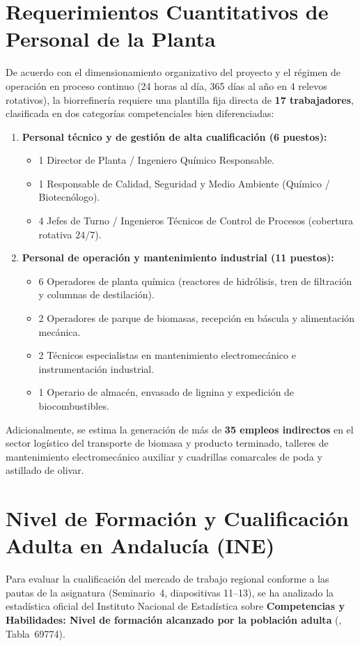 \documentclass{report}
\begin{document}
\section{Requerimientos Cuantitativos de Personal de la Planta}
De acuerdo con el dimensionamiento organizativo del proyecto y el régimen de operación en proceso continuo (\num{24} horas al día, \num{365} días al año en \num{4} relevos rotativos), la biorrefinería requiere una plantilla fija directa de \textbf{\num{17} trabajadores}, clasificada en dos categorías competenciales bien diferenciadas:
\begin{enumerate}
    \item \textbf{Personal técnico y de gestión de alta cualificación (\num{6} puestos):}
          \begin{itemize}
              \item \num{1} Director de Planta / Ingeniero Químico Responsable.
              \item \num{1} Responsable de Calidad, Seguridad y Medio Ambiente (Químico / Biotecnólogo).
              \item \num{4} Jefes de Turno / Ingenieros Técnicos de Control de Procesos (cobertura rotativa $24/7$).
          \end{itemize}
    \item \textbf{Personal de operación y mantenimiento industrial (\num{11} puestos):}
          \begin{itemize}
              \item \num{6} Operadores de planta química (reactores de hidrólisis, tren de filtración y columnas de destilación).
              \item \num{2} Operadores de parque de biomasas, recepción en báscula y alimentación mecánica.
              \item \num{2} Técnicos especialistas en mantenimiento electromecánico e instrumentación industrial.
              \item \num{1} Operario de almacén, envasado de lignina y expedición de biocombustibles.
          \end{itemize}
\end{enumerate}
Adicionalmente, se estima la generación de más de \textbf{\num{35} empleos indirectos} en el sector logístico del transporte de biomasa y producto terminado, talleres de mantenimiento electromecánico auxiliar y cuadrillas comarcales de poda y astillado de olivar.

\section{Nivel de Formación y Cualificación Adulta en Andalucía (INE)}
Para evaluar la cualificación del mercado de trabajo regional conforme a las pautas de la asignatura (Seminario~4, diapositivas 11--13), se ha analizado la estadística oficial del Instituto Nacional de Estadística sobre \textbf{Competencias y Habilidades: Nivel de formación alcanzado por la población adulta} (\autocite{INE_Formacion2025}, Tabla~69774).
\end{document}
